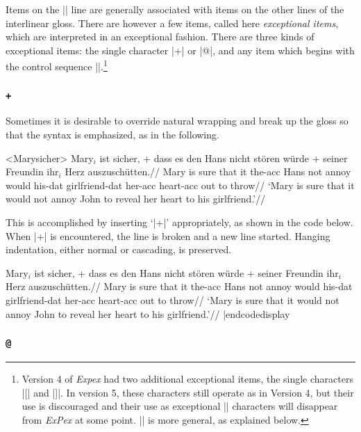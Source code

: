 Items on the |\gla| line are generally associated with items on
the other lines of the interlinear gloss.  There are however a
few items, called here {\it exceptional items}, which are
interpreted in an exceptional fashion. There are three kinds of exceptional
items: the single character |+| or |@|, and any item which begins with
the control sequence |\nogloss|.\footnote{Version 4 of {\it Expex} had
two additional exceptional items, the single characters |[| and |]|.
In version 5, these characters still operate as in Version 4, but
their use is discouraged and their use as exceptional |\gla|
characters will disappear from {\it ExPex} at some point.  |\nogloss|
is more general, as explained below.}

\subsubsection {\tt +}

%
Sometimes it is desirable to override natural wrapping and
break up the gloss so that the syntax is emphasized, as in the
following.

\framedisplay
\ex<Marysicher>
\begingl
\gla Mary$_i$ ist sicher, + dass es den Hans nicht st\"oren w\"urde
+ seiner Freundin ihr$_i$ Herz auszusch\"utten.//
\glb Mary is sure that it the-{\sc acc} Hans not annoy would
his-{\sc dat} girlfriend-{\sc dat} her-{\sc acc} heart-{\sc acc} {out to
throw}//
\glft  `Mary is sure that it would not annoy John to reveal her
heart to his girlfriend.'//
\endgl
\xe
\endframedisplay

\bigskip
This is accomplished by inserting `|+|' appropriately, as shown in the
code below.  When |+| is encountered, the line is broken and a new
line started.  Hanging indentation, either normal or cascading, is
preserved.

\codedisplay
\ex
\begingl
\gla Mary$_i$ ist sicher, + dass es den Hans nicht st\"oren w\"urde
+ seiner Freundin ihr$_i$ Herz auszusch\"utten.//
\glb Mary is sure that it the-{\sc acc} Hans not annoy would
his-{\sc dat} girlfriend-{\sc dat} her-{\sc acc} heart-{\sc acc} {out to
throw}//
\glft  `Mary is sure that it would not annoy John to reveal her
heart to his girlfriend.'//
\endgl
\xe
|endcodedisplay

\subsubsection {\tt @}

